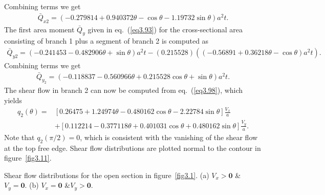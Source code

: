 \documentclass{AeroStructure-ERJohnson}
\begin{document}
\begin{example}
\vspace*{-0.3pc}\pagebreak

\noindent Combining terms we get
\begin{align}\label{ex3.2j}
\bar{Q}_{x 2}=(-0.279814+0.940372 \theta-\cos \theta-1.19732 \sin \theta) a^{2} t.\tag{j}
\end{align}
The first area moment $\bar{Q}_{y}$ given in eq.~(\ref{eq3.93}) for the cross-sectional area consisting of branch 1 plus a segment of branch 2 is computed as
\begin{align}\label{ex3.2k}
\bar{Q}_{y 2}=(-0.241453-0.482906 \theta+\sin \theta) a^{2} t-(0.215528)((-0.56891+0.36218 \theta-\cos \theta) a^{2} t).\tag{k}
\end{align}
Combining terms we get
\begin{align}\label{ex3.2l}
\bar{Q}_{y_{2}}=(-0.118837-0.560966 \theta+0.215528 \cos \theta+\sin \theta) a^{2} t. \tag{l}
\end{align}
The shear flow in branch 2 can now be computed from eq.~(\ref{eq3.98}), which yields\vspace*{-4pt}
\begin{align}\label{ex3.2m}
q_{2}(\theta)=& [0.26475+1.24974 \theta-0.480162 \cos \theta-2.22784 \sin \theta] \frac{V_{x}}{a}\nonumber\\[-3pt]
& +[0.112214-0.377118 \theta+0.401031 \cos \theta+0.480162 \sin \theta] \frac{V_{y}}{a}. \tag{m}
\end{align}
Note that $q_{2}(\pi / 2)=0$, which is consistent with the vanishing of the shear flow at the top free edge. Shear flow distributions are plotted normal to the contour in figure~\ref{fig3.11}.
\end{example}

{\def\thefigure{3.11}
{\caption{Shear flow distributions for the open section in figure~\ref{fig3.1}. (a) $V_x > \textbf{0}$ \& $V_y = \textbf{0}$. (b) $V_x = \textbf{0}$ \&\break $V_y > \textbf{0}$.}\label{fig3.11}}}
\end{document}
